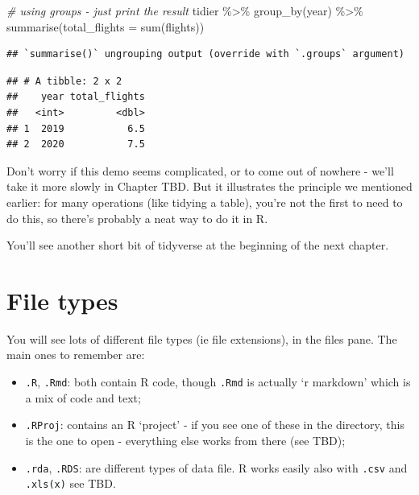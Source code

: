 \documentclass[
]{book}
\newenvironment{Shaded}{\begin{snugshade}}{\end{snugshade}}
\newcommand{\AttributeTok}[1]{\textcolor[rgb]{0.77,0.63,0.00}{#1}}
\newcommand{\CommentTok}[1]{\textcolor[rgb]{0.56,0.35,0.01}{\textit{#1}}}
\newcommand{\FunctionTok}[1]{\textcolor[rgb]{0.00,0.00,0.00}{#1}}
\newcommand{\NormalTok}[1]{#1}
\newcommand{\SpecialCharTok}[1]{\textcolor[rgb]{0.00,0.00,0.00}{#1}}
\providecommand{\tightlist}{%
  \setlength{\itemsep}{0pt}\setlength{\parskip}{0pt}}
\begin{document}
\begin{Shaded}
\begin{Highlighting}[]
\CommentTok{\# using groups {-} just print the result}
\NormalTok{tidier }\SpecialCharTok{\%\textgreater{}\%} \FunctionTok{group\_by}\NormalTok{(year) }\SpecialCharTok{\%\textgreater{}\%} 
  \FunctionTok{summarise}\NormalTok{(}\AttributeTok{total\_flights =} \FunctionTok{sum}\NormalTok{(flights))}
\end{Highlighting}
\end{Shaded}

\begin{verbatim}
## `summarise()` ungrouping output (override with `.groups` argument)
\end{verbatim}

\begin{verbatim}
## # A tibble: 2 x 2
##    year total_flights
##   <int>         <dbl>
## 1  2019           6.5
## 2  2020           7.5
\end{verbatim}

Don't worry if this demo seems complicated, or to come out of nowhere - we'll take it more slowly in Chapter TBD. But it illustrates the principle we mentioned earlier: for many operations (like tidying a table), you're not the first to need to do this, so there's probably a neat way to do it in R.

You'll see another short bit of tidyverse at the beginning of the next chapter.

\hypertarget{filetypes}{%
\section{File types}\label{filetypes}}

You will see lots of different file types (ie file extensions), in the files pane. The main ones to remember are:

\begin{itemize}
\tightlist
\item
  \texttt{.R}, \texttt{.Rmd}: both contain R code, though \texttt{.Rmd} is actually `r markdown' which is a mix of code and text;
\item
  \texttt{.RProj}: contains an R `project' - if you see one of these in the directory, this is the one to open - everything else works from there (see TBD);
\item
  \texttt{.rda}, \texttt{.RDS}: are different types of data file. R works easily also with \texttt{.csv} and \texttt{.xls(x)} see TBD.
\end{itemize}
\end{document}
